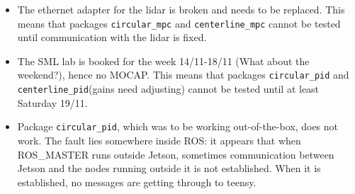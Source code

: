 \documentclass[oneside,12pt]{article}
\begin{document}
\begin{itemize}
  \item The ethernet adapter for the lidar is broken and needs to be replaced.
    This means that packages \texttt{circular\_mpc} and \texttt{centerline\_mpc}
    cannot be tested until communication with the lidar is fixed.
  \item The SML lab is booked for the week 14/11-18/11 (What about the weekend?),
    hence no MOCAP. This means that packages \texttt{circular\_pid} and
    \texttt{centerline\_pid}(gains need adjusting) cannot be tested until at
    least Saturday 19/11.
  \item Package \texttt{circular\_pid}, which was to be working out-of-the-box,
    does not work. The fault lies somewhere inside ROS: it appears that when
    ROS\_MASTER runs outside Jetson, sometimes communication between Jetson and the
    nodes running outside it is not established. When it is established, no
    messages are getting through to teensy.
\end{itemize}
\end{document}
